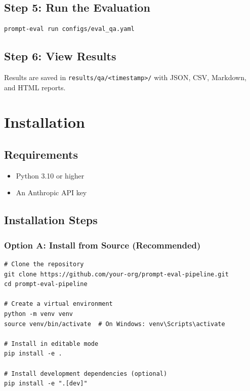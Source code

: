 \documentclass[11pt,a4paper]{report}
\begin{document}
\section{Step 5: Run the Evaluation}

\begin{lstlisting}[style=bash]
prompt-eval run configs/eval_qa.yaml
\end{lstlisting}

\section{Step 6: View Results}

Results are saved in \texttt{results/qa/<timestamp>/} with JSON, CSV, Markdown, and HTML reports.


\chapter{Installation}

\section{Requirements}

\begin{itemize}
    \item Python 3.10 or higher
    \item An Anthropic API key
\end{itemize}

\section{Installation Steps}

\subsection{Option A: Install from Source (Recommended)}

\begin{lstlisting}[style=bash]
# Clone the repository
git clone https://github.com/your-org/prompt-eval-pipeline.git
cd prompt-eval-pipeline

# Create a virtual environment
python -m venv venv
source venv/bin/activate  # On Windows: venv\Scripts\activate

# Install in editable mode
pip install -e .

# Install development dependencies (optional)
pip install -e ".[dev]"
\end{lstlisting}
\end{document}
